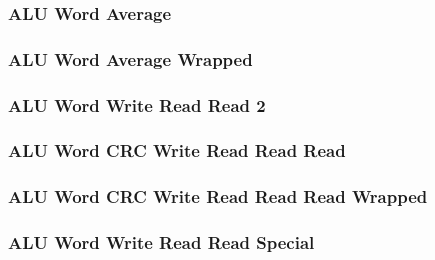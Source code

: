 \subsubsection[{\small ALU Word Average}]{ALU Word Average} \label{sec:format-ALU-WAVG}



\subsubsection[{\small ALU Word Average Wrapped}]{ALU Word Average Wrapped} \label{sec:format-ALU-WAVG.W}



\subsubsection[{\small ALU Word Write Read Read 2}]{ALU Word Write Read Read 2} \label{sec:format-ALU-WWRR2}



\subsubsection[{\small ALU Word CRC Write Read Read Read}]{ALU Word CRC Write Read Read Read} \label{sec:format-ALU-WCWRRR}



\subsubsection[{\small ALU Word CRC Write Read Read Read Wrapped}]{ALU Word CRC Write Read Read Read Wrapped} \label{sec:format-ALU-WCWRRR.W}



\subsubsection[{\small ALU Word Write Read Read Special}]{ALU Word Write Read Read Special} \label{sec:format-ALU-WWRRS}

